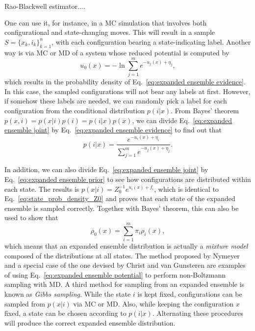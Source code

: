 \documentclass[aip,jcp,reprint,amsmath,amssymb]{revtex4-1}
\begin{document}
Rao-Blackwell estimator\cite{Ding_2017}....

One can use it, for instance, in a MC simulation that involves both configurational and state-changing moves.\cite{Lyubartsev_1992} This will result in a sample $S = \{x_k,i_k\}_{k=1}^n$, with each configuration bearing a state-indicating label. Another way is via MC or MD of a system whose reduced potential is computed by
\begin{equation}
u_0(x) = - \ln \sum_{j=1}^m e^{-u_j(x) + \eta_j},
\end{equation}
which results in the probability density of Eq.~\eqref{eq:expanded ensemble evidence}. In this case, the sampled configurations will not bear any labels at first. However, if somehow these labels are needed, we can randomly pick a label for each configuration from the conditional distribution $p(i|x)$.\cite{Nymeyer_2010} From Bayes' theorem $p(x,i) = p(x|i) p(i) = p(i|x) p(x)$, we can divide Eq.~\eqref{eq:expanded ensemble joint} by Eq.~\eqref{eq:expanded ensemble evidence} to find out that
\begin{equation}
p(i|x) = \frac{e^{-u_i(x) + \eta_i}}{\sum_{j=1}^m e^{-u_j(x) + \eta_j}}.
\end{equation}

In addition, we can also divide Eq.~\eqref{eq:expanded ensemble joint} by Eq.~\eqref{eq:expanded ensemble prior} to see how configurations are distributed within each state. The results is $p(x|i) = Z_0^{-1} e^{u_i(x) + f_i}$, which is identical to Eq.~\eqref{eq:state_prob_density_Z0} and proves that each state of the expanded ensemble is sampled correctly. Together with Bayes' theorem, this can also be used to show that
\begin{equation}
\rho_0(x) = \sum_{i=1}^m \pi_i \rho_i(x),
\end{equation}
which means that an expanded ensemble distribution is actually a \textit{mixture model}\cite{Lindsay_1995, Marin_2005} composed of the distributions at all states. The method proposed by Nymeyer\cite{Nymeyer_2010} and a special case of the one devised by Christ and van Gunsteren\cite{Christ_2007, *Christ_2008, *Christ_2009} are examples of using Eq.~\eqref{eq:expanded ensemble potential} to perform non-Boltzmann sampling with MD. A third method for sampling from an expanded ensemble is known as \textit{Gibbs sampling}.\cite{Marin_2005, Chodera_2011} While the state $i$ is kept fixed, configurations can be sampled from $p(x|i)$ via MC or MD. Also, while keeping the configuration $x$ fixed, a state can be chosen according to $p(i|x)$. Alternating these procedures will produce the correct expanded ensemble distribution.\cite{Chodera_2011}
\end{document}
